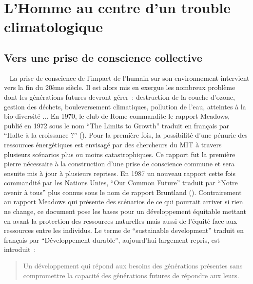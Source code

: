 


\section{L’Homme au centre d’un trouble climatologique} %
\label{sec:l_homme_au_centre_d_un_trouble_climatologique}
\subsection{Vers une prise de conscience collective} %
\label{sub:vers_une_prise_de_conscience_collective}
~
La prise de conscience de l’impact de l’humain sur son environnement intervient vers
la fin du 20ème siècle. Il est alors mis en exergue les nombreux problème dont les
générations futures devront gérer~: destruction de la couche d’ozone, gestion des
déchets, bouleversement climatiques, pollution de l’eau, atteintes à la bio-diversité ...
En 1970, le club de Rome commandite le rapport Meadows, publié en
1972 sous le nom \enquote{The Limits to Growth} traduit en français par
\enquote{Halte à la croissance ?} ().
Pour la première fois, la possibilité d’une pénurie des ressources énergétiques est
envisagé par des chercheurs du MIT à travers plusieurs scénarios plus ou moins
catastrophiques. Ce rapport fut la première pierre nécessaire à la construction d’une
prise de conscience commune et sera ensuite mis à jour à plusieurs reprises.
En 1987 un nouveau rapport cette fois commandité par
les Nations Unies, \enquote{Our Common Future} traduit par \enquote{Notre avenir à tous}
plus connus sous le nom de rapport Bruntland (). Contrairement
au rapport Meadows qui présente des scénarios de ce qui pourrait arriver si rien ne change,
ce document pose les bases pour un développement équitable mettant en avant
la protection des ressources naturelles mais aussi de l’équité face aux ressources
entre les individus. Le terme de \enquote{sustainable development} traduit en français
par \enquote{Développement durable}, aujourd’hui largement repris, est introduit~:
\blockquote{
    Un développement qui répond aux besoins des générations présentes sans
    compromettre la capacité des générations futures de répondre aux leurs.
}

